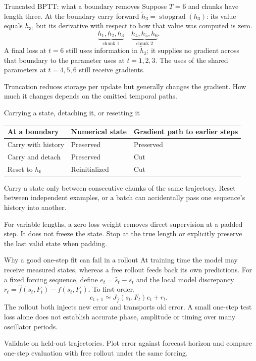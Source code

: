 \documentclass[aspectratio=169,11pt]{beamer}
\begin{document}
\begin{frame}{Truncated BPTT: what a boundary removes}
Suppose $T=6$ and chunks have length three. At the boundary carry forward
$\tilde h_3=\operatorname{stopgrad}(h_3)$: its value equals $h_3$, but its
derivative with respect to how that value was computed is zero.
\[
\underbrace{h_1,h_2,h_3}_{\text{chunk 1}}\quad
\underbrace{h_4,h_5,h_6}_{\text{chunk 2}} .
\]
A final loss at $t=6$ still uses information in $\tilde h_3$; it supplies no
gradient across that boundary to the parameter uses at $t=1,2,3$.
The uses of the shared parameters at $t=4,5,6$ still receive gradients.
\par
Truncation reduces storage per update but generally changes the gradient.
How much it changes depends on the omitted temporal paths.
\end{frame}
\begin{frame}{Carrying a state, detaching it, or resetting it}
\begin{center}\begin{tabular}{lll}\toprule
At a boundary & Numerical state & Gradient path to earlier steps\\\midrule
Carry with history & Preserved & Preserved\\
Carry and detach & Preserved & Cut\\
Reset to $h_0$ & Reinitialized & Cut\\\bottomrule
\end{tabular}\end{center}
Carry a state only between consecutive chunks of the same trajectory.
Reset between independent examples, or a batch can accidentally pass one
sequence's history into another.
\par
For variable lengths, a zero loss weight removes direct supervision at a padded
step. It does not freeze the state. Stop at the true length or explicitly
preserve the last valid state when padding.
\end{frame}
\begin{frame}{Why a good one-step fit can fail in a rollout}
At training time the model may receive measured states, whereas a free
rollout feeds back its own predictions. For a fixed forcing sequence,
define $e_t=\hat s_t-s_t$ and the local model discrepancy
$r_t=\hat f(s_t,F_t)-f(s_t,F_t)$. To first order,
\[
e_{t+1}\simeq J_{\hat f}(s_t,F_t)e_t+r_t .
\]
The rollout both injects new error and transports old error. A small one-step
test loss alone does not establish accurate phase, amplitude or timing over
many oscillator periods.
\par
Validate on held-out trajectories. Plot error against forecast horizon and
compare one-step evaluation with free rollout under the same forcing.
\end{frame}
\end{document}
